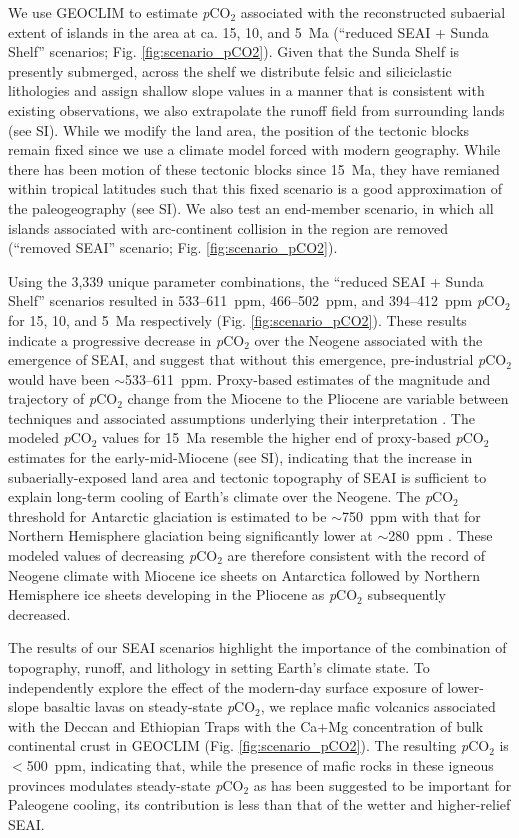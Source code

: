 \documentclass[11pt,letterpaper]{article}
\newcommand{\pCOtwo}{\textit{p}CO$_{2}$\xspace}
\begin{document}
We use GEOCLIM to estimate \pCOtwo associated with the reconstructed subaerial extent of islands in the area at ca. 15, 10, and 5~Ma (``reduced SEAI + Sunda Shelf'' scenarios; Fig. \ref{fig:scenario_pCO2}). Given that the Sunda Shelf is presently submerged, across the shelf we distribute felsic and siliciclastic lithologies and assign shallow slope values in a manner that is consistent with existing observations, we also extrapolate the runoff field from surrounding lands (see SI). While we modify the land area, the position of the tectonic blocks remain fixed since we use a climate model forced with modern geography. While there has been motion of these tectonic blocks since 15~Ma, they have remianed within tropical latitudes such that this fixed scenario is a good approximation of the paleogeography (see SI). We also test an end-member scenario, in which all islands associated with arc-continent collision in the region are removed (``removed SEAI'' scenario; Fig. \ref{fig:scenario_pCO2}).

Using the 3,339 unique parameter combinations, the ``reduced SEAI + Sunda Shelf'' scenarios resulted in 533--611~ppm, 466--502~ppm, and 394--412~ppm \pCOtwo for 15, 10, and 5~Ma respectively (Fig. \ref{fig:scenario_pCO2}). These results indicate a progressive decrease in \pCOtwo over the Neogene associated with the emergence of SEAI, and suggest that without this emergence, pre-industrial \pCOtwo would have been $\sim$533--611~ppm. Proxy-based estimates of the magnitude and trajectory of \pCOtwo change from the Miocene to the Pliocene are variable between techniques and associated assumptions underlying their interpretation \cite{Foster2017a, Mejia2017a, Ji2018a}. The modeled \pCOtwo values for 15~Ma resemble the higher end of proxy-based \pCOtwo estimates for the early-mid-Miocene (see SI), indicating that the increase in subaerially-exposed land area and tectonic topography of SEAI is sufficient to explain long-term cooling of Earth's climate over the Neogene. The \pCOtwo threshold for Antarctic glaciation is estimated to be $\sim$750~ppm with that for Northern Hemisphere glaciation being significantly lower at $\sim$280~ppm \cite{DeConto2008a}. These modeled values of decreasing \pCOtwo are therefore consistent with the record of Neogene climate with Miocene ice sheets on Antarctica followed by Northern Hemisphere ice sheets developing in the Pliocene as \pCOtwo subsequently decreased.

The results of our SEAI scenarios highlight the importance of the combination of topography, runoff, and lithology in setting Earth's climate state. To independently explore the effect of the modern-day surface exposure of lower-slope basaltic lavas on steady-state \pCOtwo \cite{Kent2008a, Kent2013a}, we replace mafic volcanics associated with the Deccan and Ethiopian Traps with the Ca+Mg concentration of bulk continental crust in GEOCLIM (Fig. \ref{fig:scenario_pCO2}). The resulting \pCOtwo is $<$500~ppm, indicating that, while the presence of mafic rocks in these igneous provinces modulates steady-state \pCOtwo as has been suggested to be important for Paleogene cooling\cite{Kent2008a, Kent2013a}, its contribution is less than that of the wetter and higher-relief SEAI.
\end{document}
